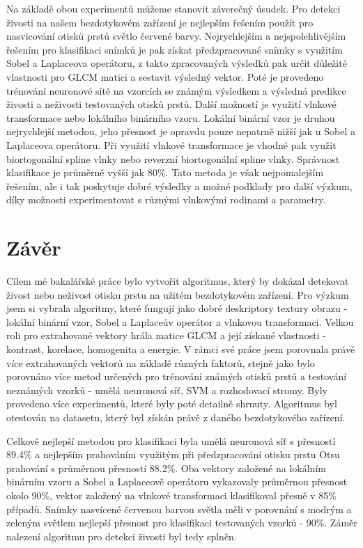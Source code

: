 Na základě obou experimentů můžeme stanovit záverečný úsudek. Pro detekci živosti na našem bezdotykovém zařízení je nejlepším řešením použít pro nasvicování otisků prstů světlo červené barvy. Nejrychlejším a nejspolehlivějším řešením pro klasifikaci snímků je pak získat předzpracované snímky s využitím Sobel a Laplaceova operátoru, z takto zpracovaných výsledků pak určit důležité vlastnosti pro GLCM matici a sestavit výsledný vektor. Poté je provedeno trénování neuronové sítě na vzorcích se známým výsledkem a výsledná predikce živosti a neživosti testovaných otisků prstů. Další možností je využití vlnkové transformace nebo lokálního binárního vzoru. Lokální binární vzor je druhou nejrychlejší metodou, jeho přesnost je opravdu pouze nepatrně nižší jak u Sobel a Laplaceova operátoru. Při využití vlnkové transformace je vhodné pak využít biortogonální spline vlnky nebo reverzní biortogonální spline vlnky. Správnost klasifikace je průměrně vyšší jak 80\%. Tato metoda je však nejpomalejším řešením, ale i tak poskytuje dobré výsledky a možné podklady pro další výzkum, díky možnosti experimentovat s různými vlnkovými rodinami a parametry.


\label{citace}

\chapter{Závěr}
Cílem mé bakalářské práce bylo vytvořit algoritmus, který by dokázal detekovat živost nebo neživost otisku prstu na užitém bezdotykovém zařízení. Pro výzkum jsem si vybrala algoritmy, které fungují jako dobré deskriptory textury obrazu - lokální binární vzor, Sobel a Laplaceův operátor a vlnkovou transformaci. Velkou roli pro extrahované vektory hrála matice GLCM a její získané vlastnosti - kontrast, korelace, homogenita a energie. V rámci své práce jsem porovnala právě více extrahovaných vektorů na základě různých faktorů, stejně jako bylo porovnáno více metod určených pro trénování známých otisků prstů a testování neznámých vzorků - umělá neuronová síť, SVM a rozhodovací stromy. Byly provedeno více experimentů, které byly poté detailně shrnuty. Algoritmus byl otestován na datasetu, který byl získán právě z daného bezdotykového zařízení. 

Celkově nejlepší metodou pro klasifikaci byla umělá neuronová síť s přesností 89.4\% a nejlepším prahováním využitým při předzpracování otisku prstu Otsu prahování s průměrnou přesností 88.2\%. Oba vektory založené na lokálním binárním vzoru a Sobel a Laplaceově operátoru vykazovaly průměrnou přesnost okolo 90\%, vektor založený na vlnkové transformaci klasifikoval přesně v 85\% případů. Snímky nasvícené červenou barvou světla měli v porovnání s modrým a zeleným světlem nejlepší přesnost pro klasifikaci testovaných vzorků - 90\%. Záměr nalezení algoritmu pro detekci živosti byl tedy splněn. 

